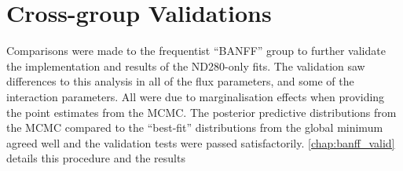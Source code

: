 \section{Cross-group Validations}
Comparisons were made to the frequentist ``BANFF'' group to further validate the implementation and results of the ND280-only fits. The validation saw differences to this analysis in all of the flux parameters, and some of the interaction parameters. All were due to marginalisation effects when providing the point estimates from the MCMC. The posterior predictive distributions from the MCMC compared to the ``best-fit'' distributions from the global minimum agreed well and the validation tests were passed satisfactorily. \autoref{chap:banff_valid} details this procedure and the results